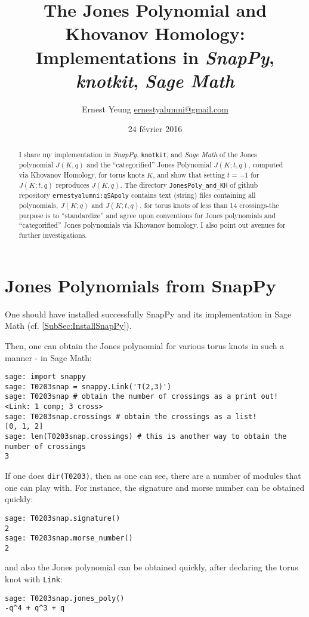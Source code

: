 \documentclass[10pt]{amsart}
\title[Jones Polynomial and Khovanov Homology]{The Jones Polynomial and Khovanov Homology: Implementations in \emph{SnapPy}, \emph{knotkit}, \emph{Sage Math}}
\author{Ernest Yeung \href{mailto:ernestyalumni@gmail.com}{ernestyalumni@gmail.com}}
\date{24 f\'{e}vrier 2016}
\begin{document}

\maketitle

\tableofcontents



\begin{abstract}
I share my implementation in \emph{SnapPy}, \verb|knotkit|, and \emph{Sage Math} of the Jones polynomial $J(K,q)$ and the ``categorified'' Jones Polynomial $J(K;t,q)$, computed via Khovanov Homology, for torus knots $K$, and show that setting $t=-1$ for $J(K;t,q)$ reproduces $J(K,q)$.  The directory \verb|JonesPoly_and_KH| of github repository \verb|ernestyalumni:qSApoly| contains text (string) files containing all polynomials, $J(K;q)$ and $J(K;t,q)$, for torus knots of less than 14 crossings-the purpose is to ``standardize'' and agree upon conventions for Jones polynomials and ``categorified'' Jones polynomials via Khovanov homology.  I also point out avenues for further investigations.  
\end{abstract}






\section{Jones Polynomials from SnapPy}

One should have installed successfully SnapPy and its implementation in Sage Math (cf. \ref{SubSec:InstallSnapPy}).  

Then, one can obtain the Jones polynomial for various torus knots in such a manner - in Sage Math:
\begin{lstlisting}
sage: import snappy
sage: T0203snap = snappy.Link('T(2,3)')
sage: T0203snap # obtain the number of crossings as a print out!
<Link: 1 comp; 3 cross>
sage: T0203snap.crossings # obtain the crossings as a list!
[0, 1, 2]
sage: len(T0203snap.crossings) # this is another way to obtain the number of crossings
3
\end{lstlisting}
If one does \verb|dir(T0203)|, then as one can see, there are a number of modules that one can play with.  For instance, the signature and morse number can be obtained quickly:
\begin{lstlisting}
sage: T0203snap.signature()
2
sage: T0203snap.morse_number()
2
\end{lstlisting}
and also the Jones polynomial can be obtained quickly, after declaring the torus knot with \verb|Link|:
\begin{lstlisting}
sage: T0203snap.jones_poly()
-q^4 + q^3 + q
\end{lstlisting}
\end{document}
